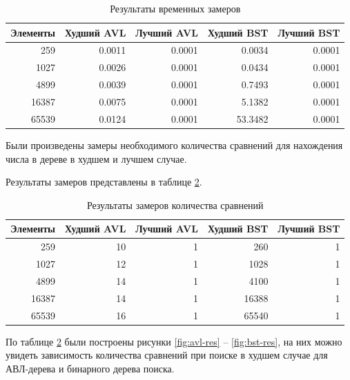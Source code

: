 \begin{table}[h]
	\begin{center}
		\begin{threeparttable}
			\captionsetup{justification=raggedright,singlelinecheck=off}
			\caption{Результаты временных замеров}
			\label{tbl:times}
			\begin{tabular}{|r|r|r|r|r|}
				\hline
				Элементы & Худший AVL & Лучший AVL & Худший BST & Лучший BST \\
				\hline
				259 & 0.0011 & 0.0001 & 0.0034 & 0.0001 \\ 
				\hline
				1027 & 0.0026 & 0.0001 & 0.0434 & 0.0001 \\ 
				\hline
				4899 & 0.0039 & 0.0001 & 0.7493 & 0.0001 \\ 
				\hline
				16387 & 0.0075 & 0.0001 & 5.1382 & 0.0001 \\ 
				\hline
				65539 & 0.0124 & 0.0001 & 53.3482 & 0.0001 \\ 
				\hline
			\end{tabular}
		\end{threeparttable}
	\end{center}
\end{table}

\newpage
Были произведены замеры необходимого количества сравнений для нахождения числа в дереве в худшем и лучшем случае.

Результаты замеров представлены в таблице \ref*{tbl:time}.

\begin{table}[h]
	\begin{center}
		\begin{threeparttable}
			\captionsetup{justification=raggedright,singlelinecheck=off}
			\caption{Результаты замеров количества сравнений}
			\label{tbl:time}
			\begin{tabular}{|r|r|r|r|r|}
				\hline
				Элементы & Худший AVL & Лучший AVL & Худший BST & Лучший BST \\
				\hline
				259 & 10 & 1 & 260 & 1 \\ 
				\hline
				1027 & 12 & 1 & 1028 & 1 \\ 
				\hline
				4899 & 14 & 1 & 4100 & 1 \\ 
				\hline
				16387 & 14 & 1 & 16388 & 1 \\ 
				\hline
				65539 & 16 & 1 & 65540 & 1 \\ 
				\hline
			\end{tabular}
		\end{threeparttable}
	\end{center}
\end{table}
По таблице \ref*{tbl:time} были построены рисунки \ref*{fig:avl-res} -- \ref*{fig:bst-res}, на них можно увидеть зависимость количества сравнений при поиске в худшем случае для АВЛ-дерева и бинарного дерева поиска.

